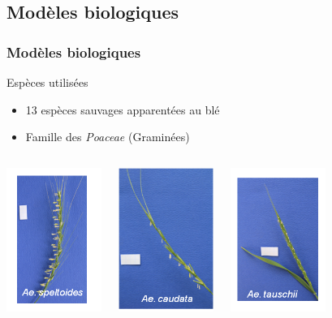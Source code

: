 \subsection{Modèles biologiques}
\begin{frame}

    \frametitle{Modèles biologiques}
    \begin{block}{Espèces utilisées}
        \begin{itemize}
            \item 13 espèces sauvages apparentées au blé 
            \item Famille des \textit{Poaceae} (Graminées)
        \end{itemize}
    \end{block}

    \begin{columns}[c] %
        \includegraphics[height=4.7cm]{./Illustrations/Plante1.png}
        
        \includegraphics[height=4.7cm]{./Illustrations/Plante2.png}
        
        \includegraphics[height=4.7cm]{./Illustrations/Plante3.png}
    \end{columns}
\end{frame}
  
